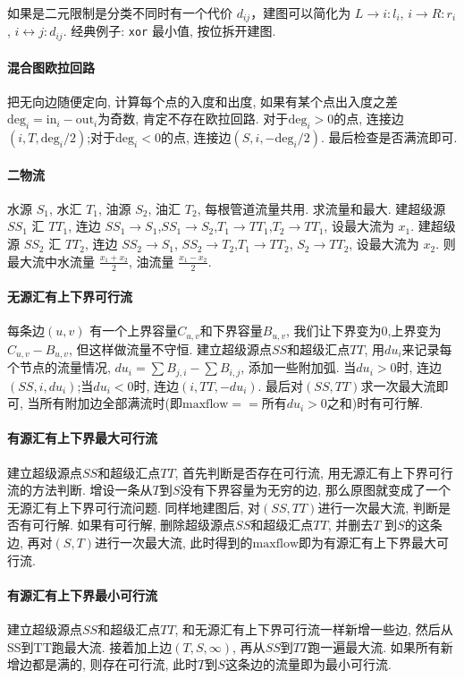 如果是二元限制是分类不同时有一个代价 $d_{ij}$，建图可以简化为 $L\rightarrow i: l_i$, $i \rightarrow R: r_i$,
$i \leftrightarrow j: d_{ij}$. 经典例子: \texttt{xor} 最小值, 按位拆开建图.

\paragraph{混合图欧拉回路}把无向边随便定向, 计算每个点的入度和出度, 如果有某个点出入度之差$\mathrm{deg}_i=\mathrm{in}_i-\mathrm{out}_i$为奇数, 肯定不存在欧拉回路. 对于$\mathrm{deg}_i>0$的点, 连接边$(i,T,\mathrm{deg}_i/2)$;对于$\mathrm{deg}_i<0$的点, 连接边$(S,i,-\mathrm{deg}_i/2)$. 最后检查是否满流即可. 
\paragraph{二物流}
水源 $S_1$, 水汇 $T_1$, 油源 $S_2$, 油汇 $T_2$, 每根管道流量共用. 求流量和最大.
建超级源 $SS_1$ 汇 $TT_1$, 连边 $SS_1\to S_1$,$SS_1\to S_2$,$T_1\to TT_1$,$T_2 \to TT_1$, 设最大流为 $x_1$.
建超级源 $SS_2$ 汇 $TT_2$, 连边 $SS_2 \to S_1$, $SS_2\to T_2$,$T_1\to TT_2$, $S_2\to TT_2$, 设最大流为 $x_2$.
则最大流中水流量 $\frac{x_1 + x_2}{2}$, 油流量 $\frac{x_1-x_2}{2}$.

\paragraph{无源汇有上下界可行流}
每条边$(u,v)$ 有一个上界容量$C_{u,v}$和下界容量$B_{u,v}$, 我们让下界变为$0$,上界变为$C_{u,v}-B_{u,v}$, 但这样做流量不守恒. 建立超级源点$SS$和超级汇点$TT$, 用$du_i$来记录每个节点的流量情况, $du_i=\sum B_{j,i}-\sum B_{i,j}$, 添加一些附加弧. 当$du_i>0$时, 连边$(SS,i,du_i)$;当$du_i<0$时, 连边$(i,TT,-du_i)$. 最后对$(SS,TT)$求一次最大流即可, 当所有附加边全部满流时(即$\mathrm{maxflow}==$所有$du_i>0$之和)时有可行解. 
\paragraph{有源汇有上下界最大可行流}
建立超级源点$SS$和超级汇点$TT$, 首先判断是否存在可行流, 用无源汇有上下界可行流的方法判断. 增设一条从$T$到$S$没有下界容量为无穷的边, 那么原图就变成了一个无源汇有上下界可行流问题. 同样地建图后, 对$(SS,TT)$进行一次最大流, 判断是否有可行解. 
如果有可行解, 删除超级源点$SS$和超级汇点$TT$, 并删去$T$ 到$S$的这条边, 再对$(S,T)$进行一次最大流, 此时得到的$\mathrm{maxflow}$即为有源汇有上下界最大可行流. 
\paragraph{有源汇有上下界最小可行流}
建立超级源点$SS$和超级汇点$TT$, 和无源汇有上下界可行流一样新增一些边, 然后从SS到TT跑最大流. 接着加上边$(T,S,\infty)$, 再从$SS$到$TT$跑一遍最大流. 
如果所有新增边都是满的, 则存在可行流, 此时$T$到$S$这条边的流量即为最小可行流. 
